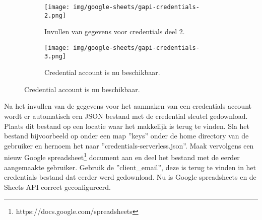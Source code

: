 \begin{figure}[h]\ContinuedFloat
    \begin{subfigure}{0.5\textwidth}
        \captionsetup{width=0.8\linewidth}
        \texttt{[image: img/google-sheets/gapi-credentials-2.png]}
        \centering
        \caption{Invullen van gegevens voor credentials deel 2.}
    \end{subfigure}
    \begin{subfigure}{0.5\textwidth}
        \captionsetup{width=0.8\linewidth}
        \texttt{[image: img/google-sheets/gapi-credentials-3.png]}
        \centering
        \caption{Credential account is nu beschikbaar.}
    \end{subfigure}
\end{figure}

Na het invullen van de gegevens voor het aanmaken van een credentials account wordt er automatisch een JSON bestand met de credential sleutel gedownload. Plaats dit bestand op een locatie waar het makkelijk is terug te vinden. Sla het bestand bijvoorbeeld op onder een map ''keys'' onder de home directory van de gebruiker en hernoem het naar ''credentials-serverless.json''. Maak vervolgens een nieuw Google spreadsheet\footnote{https://docs.google.com/spreadsheets} document aan en deel het bestand met de eerder aangemaakte gebruiker. Gebruik de ''client\_email'', deze is terug te vinden in het credentials bestand dat eerder werd gedownload. Nu is Google spreadsheets en de Sheets API correct geconfigureerd.